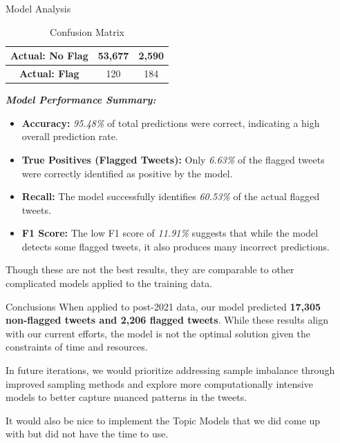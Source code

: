 \documentclass[final]{beamer}
\newlength{\sepwidth}
\newlength{\colwidth}
\newcommand{\separatorcolumn}{\begin{column}{\sepwidth}\end{column}}
\begin{document}
\begin{frame}[t]
\begin{columns}[t]
\begin{column}{\colwidth}
\begin{block}{Model Analysis}
\begin{table}[h!]
\begin{tabular}{|c|c|c|}
                \hline
                \textbf{Actual: No Flag} & 53,677 & 2,590 \\
                \hline
                \textbf{Actual: Flag} & 120 & 184 \\
                \hline
        \end{tabular}
\caption{Confusion Matrix}
\end{table}
        \vspace*{-15pt}
        \textbf{\emph{Model Performance Summary:}}
        \vspace*{-15pt}
        \begin{itemize}
            \item \textbf{Accuracy:} \emph{95.48\%} of total predictions were correct, indicating a high overall prediction rate.
            \item \textbf{True Positives (Flagged Tweets):} Only \emph{6.63\%} of the flagged tweets were correctly identified as positive by the model.
            \item \textbf{Recall:} The model successfully identifies \emph{60.53\%} of the actual flagged tweets.
            \item \textbf{F1 Score:} The low F1 score of \emph{11.91\%} suggests that while the model detects some flagged tweets, it also produces many incorrect predictions.
        \end{itemize}
        \vspace*{-15pt}
        Though these are not the best results, they are comparable to other complicated models applied to the training data.
    \end{block}
\vspace*{-15pt}
  \begin{block}{Conclusions}
    When applied to post-2021 data, our model predicted \textbf{17,305 non-flagged tweets and 2,206 flagged tweets}. While these results align with our current efforts, the model is not the optimal solution given the constraints of time and resources.
    
    In future iterations, we would prioritize addressing sample imbalance through improved sampling methods and explore more computationally intensive models to better capture nuanced patterns in the tweets.

    It would also be nice to implement the Topic Models that we did come up with but did not have the time to use.
    
  \begin{large}
\begin{itemize}

\end{itemize}
\end{large}
\end{block}

\end{column}


\separatorcolumn
\end{columns}

\end{frame}
\end{document}
